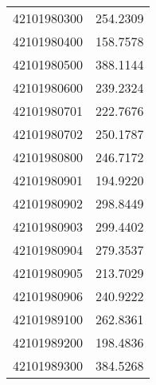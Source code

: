 \begin{longtable}[t]{lr}
42101980300 & 254.2309\\
42101980400 & 158.7578\\
42101980500 & 388.1144\\
42101980600 & 239.2324\\
42101980701 & 222.7676\\
42101980702 & 250.1787\\
42101980800 & 246.7172\\
42101980901 & 194.9220\\
42101980902 & 298.8449\\
42101980903 & 299.4402\\
42101980904 & 279.3537\\
42101980905 & 213.7029\\
42101980906 & 240.9222\\
42101989100 & 262.8361\\
42101989200 & 198.4836\\
42101989300 & 384.5268\\*
\end{longtable}
